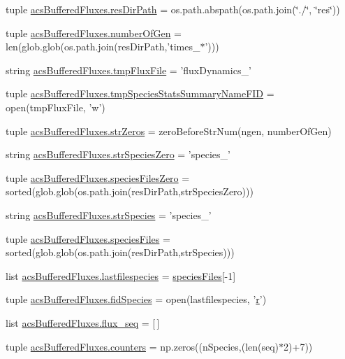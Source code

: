 \begin{DoxyCompactItemize}
\item 
tuple \hyperlink{a00098_abc625ab1aeed5741a02bbaccfbee5c06}{acs\-Buffered\-Fluxes.\-res\-Dir\-Path} = os.\-path.\-abspath(os.\-path.\-join(\char`\"{}./\char`\"{}, \char`\"{}res\char`\"{}))
\item 
tuple \hyperlink{a00098_acd3059fa3a61438f739193dc80f23b80}{acs\-Buffered\-Fluxes.\-number\-Of\-Gen} = len(glob.\-glob(os.\-path.\-join(res\-Dir\-Path,'times\-\_\-$\ast$')))
\item 
string \hyperlink{a00098_a170166907641e54151f8d83d51420165}{acs\-Buffered\-Fluxes.\-tmp\-Flux\-File} = 'flux\-Dynamics\-\_\-'
\item 
tuple \hyperlink{a00098_a0b5b14621851cbf162c61aa936ca5f2d}{acs\-Buffered\-Fluxes.\-tmp\-Species\-Stats\-Summary\-Name\-F\-I\-D} = open(tmp\-Flux\-File, 'w')
\item 
tuple \hyperlink{a00098_abfa8fbc48a0ad5b6dff6914d6052b2b6}{acs\-Buffered\-Fluxes.\-str\-Zeros} = zero\-Before\-Str\-Num(ngen, number\-Of\-Gen)
\item 
string \hyperlink{a00098_a658920d97b6df23e672e290d362033b4}{acs\-Buffered\-Fluxes.\-str\-Species\-Zero} = 'species\-\_\-'
\item 
tuple \hyperlink{a00098_a8c18127c32adcc1a3403749a047270e5}{acs\-Buffered\-Fluxes.\-species\-Files\-Zero} = sorted(glob.\-glob(os.\-path.\-join(res\-Dir\-Path,str\-Species\-Zero)))
\item 
string \hyperlink{a00098_a36518d8de93502466a6d4b2e62eb7734}{acs\-Buffered\-Fluxes.\-str\-Species} = 'species\-\_\-'
\item 
tuple \hyperlink{a00098_ae41c9dafcdeb581e70eeb889d16c6551}{acs\-Buffered\-Fluxes.\-species\-Files} = sorted(glob.\-glob(os.\-path.\-join(res\-Dir\-Path,str\-Species)))
\item 
list \hyperlink{a00098_a887b4124ed717643d4e79b6d9597109f}{acs\-Buffered\-Fluxes.\-lastfilespecies} = \hyperlink{a00028_af5703745c2c2a6af7f62da460994d9c2}{species\-Files}\mbox{[}-\/1\mbox{]}
\item 
tuple \hyperlink{a00098_ad38778cd180f00344e8a8d68511f56fd}{acs\-Buffered\-Fluxes.\-fid\-Species} = open(lastfilespecies, '\hyperlink{a00031_ac862e7284527eb913b1351c8bfb8e079}{r}')
\item 
list \hyperlink{a00098_a99cfaccf97d11133896704acd137057d}{acs\-Buffered\-Fluxes.\-flux\-\_\-seq} = \mbox{[}$\,$\mbox{]}
\item 
tuple \hyperlink{a00098_ab6476d4caeb73c29cf068374a1c8285d}{acs\-Buffered\-Fluxes.\-counters} = np.\-zeros((n\-Species,(len(seq)$\ast$2)+7))

\end{DoxyCompactItemize}
